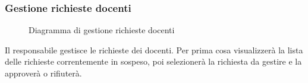 \documentclass[a4paper, titlepage]{article}
\begin{document}
\newpage
\subsubsection{Gestione richieste docenti}
\begin{figure}[H]
	\centering
	\noindent{}
	\caption{Diagramma di gestione richieste docenti}
\end{figure}
Il responsabile gestisce le richieste dei docenti. Per prima cosa visualizzerà la lista delle richieste correntemente in sospeso, poi selezionerà la richiesta da gestire e la approverà o rifiuterà.

\newpage
\end{document}
